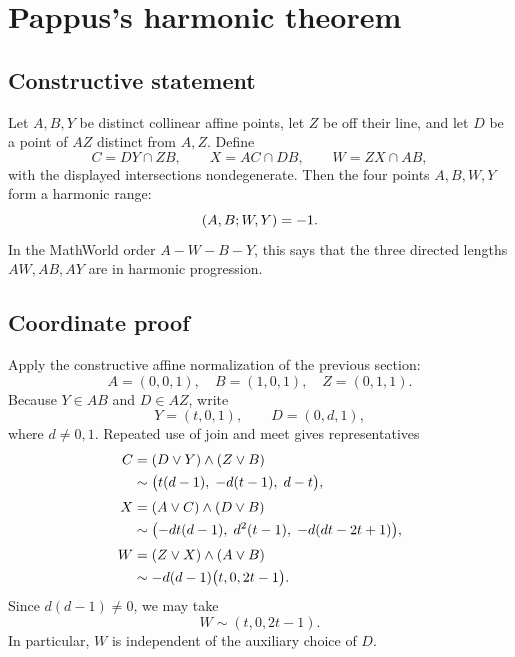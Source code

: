 \section{Pappus's harmonic theorem}

\subsection{Constructive statement}

Let $A,B,Y$ be distinct collinear affine points, let $Z$ be off their line, and let $D$ be a point of $AZ$ distinct from $A,Z$.  Define
\[
C=DY\cap ZB,
\qquad X=AC\cap DB,
\qquad W=ZX\cap AB,
\]
with the displayed intersections nondegenerate.  Then the four points $A,B,W,Y$ form a harmonic range:
\[
(A,B;W,Y)=-1.
\]
In the MathWorld order $A-W-B-Y$, this says that the three directed lengths $AW,AB,AY$ are in harmonic progression.

\begin{center}
\end{center}

\subsection{Coordinate proof}

Apply the constructive affine normalization of the previous section:
\[
A=(0,0,1),\quad B=(1,0,1),\quad Z=(0,1,1).
\]
Because $Y\in AB$ and $D\in AZ$, write
\[
Y=(t,0,1),\qquad D=(0,d,1),
\]
where $d\ne0,1$.  Repeated use of join and meet gives representatives
\begin{align*}
C&=(D\mathbin{\vee} Y)\mathbin{\wedge}(Z\mathbin{\vee} B)\\
 &\sim\bigl(t(d-1),\;-d(t-1),\;d-t\bigr),\\[0.3em]
X&=(A\mathbin{\vee} C)\mathbin{\wedge}(D\mathbin{\vee} B)\\
 &\sim\bigl(-dt(d-1),\;d^2(t-1),\;-d(dt-2t+1)\bigr),\\[0.3em]
W&=(Z\mathbin{\vee} X)\mathbin{\wedge}(A\mathbin{\vee} B)\\
 &\sim -d(d-1)\bigl(t,0,2t-1\bigr).
\end{align*}
Since $d(d-1)\ne0$, we may take
\[
W\sim(t,0,2t-1).
\]
In particular, $W$ is independent of the auxiliary choice of $D$.

